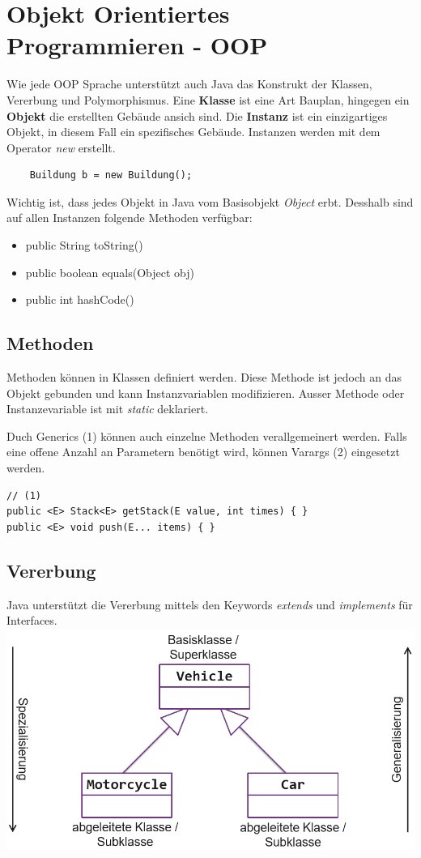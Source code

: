 \section{Objekt Orientiertes Programmieren - OOP}
Wie jede OOP Sprache unterstützt auch Java das Konstrukt der Klassen, Vererbung und Polymorphismus. Eine \textbf{Klasse} ist eine Art Bauplan, hingegen ein \textbf{Objekt} die erstellten Gebäude ansich sind. Die \textbf{Instanz} ist ein einzigartiges Objekt, in diesem Fall ein spezifisches Gebäude. Instanzen werden mit dem Operator \textit{new} erstellt.
\begin{lstlisting}
	Buildung b = new Buildung();
\end{lstlisting}
Wichtig ist, dass jedes Objekt in Java vom Basisobjekt \textit{Object} erbt. Desshalb sind auf allen Instanzen folgende Methoden verfügbar:
\begin{itemize}[nosep]
	\item public String toString()
	\item public boolean equals(Object obj)
	\item public int hashCode()
\end{itemize}

\subsection{Methoden}
Methoden können in Klassen definiert werden. Diese Methode ist jedoch an das Objekt gebunden und kann Instanzvariablen modifizieren. Ausser Methode oder Instanzevariable ist mit \textit{static} deklariert.

Duch Generics (1) können auch einzelne Methoden verallgemeinert werden. Falls eine offene Anzahl an Parametern benötigt wird, können Varargs (2) eingesetzt werden.
\begin{lstlisting}
// (1)
public <E> Stack<E> getStack(E value, int times) { }
public <E> void push(E... items) { }
\end{lstlisting}


\subsection{Vererbung}
Java unterstützt die Vererbung mittels den Keywords \textit{extends} und \textit{implements} für Interfaces.\\
\includegraphics[width=\columnwidth]{Images/vererbung}

